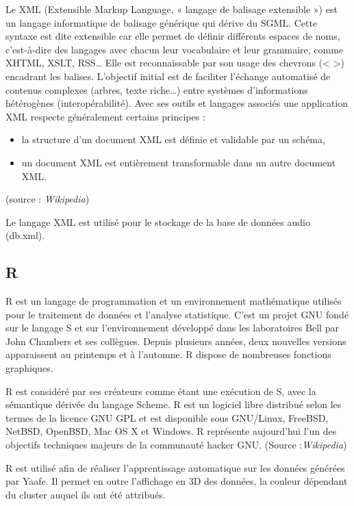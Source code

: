 \documentclass{report}
\begin{document}
Le XML (Extensible Markup Language, « langage de balisage extensible ») est un langage informatique de balisage générique qui dérive du SGML. Cette syntaxe est dite extensible car elle permet de définir différents espaces de noms, c'est-à-dire des langages avec chacun leur vocabulaire et leur grammaire, comme XHTML, XSLT, RSS… Elle est reconnaissable par son usage des chevrons (< >) encadrant les balises. L'objectif initial est de faciliter l'échange automatisé de contenus complexes (arbres, texte riche…) entre systèmes d'informations hétérogènes (interopérabilité). Avec ses outils et langages associés une application XML respecte généralement certains principes :
\begin{itemize}
\item    la structure d'un document XML est définie et validable par un schéma,
\item    un document XML est entièrement transformable dans un autre document XML.
\end{itemize}
(source : \emph{Wikipedia})


Le langage XML est utilisé pour le stockage de la base de données audio (db.xml). 

\subsection{R}

R est un langage de programmation et un environnement mathématique utilisés pour le traitement de données et l'analyse statistique. C'est un projet GNU fondé sur le langage S et sur l'environnement développé dans les laboratoires Bell par John Chambers et ses collègues. Depuis plusieurs années, deux nouvelles versions apparaissent au printemps et à l'automne. R dispose de nombreuses fonctions graphiques.

R est considéré par ses créateurs comme étant une exécution de S, avec la sémantique dérivée du langage Scheme. R est un logiciel libre distribué selon les termes de la licence GNU GPL et est disponible sous GNU/Linux, FreeBSD, NetBSD, OpenBSD, Mac OS X et Windows. R représente aujourd'hui l'un des objectifs techniques majeurs de la communauté hacker GNU. (Source :\emph{Wikipedia})



R est utilisé afin de réaliser l'apprentissage automatique sur les données générées par Yaafe. Il permet en outre l'affichage en 3D des données, la couleur dépendant du cluster auquel ils ont été attribués.
\end{document}
